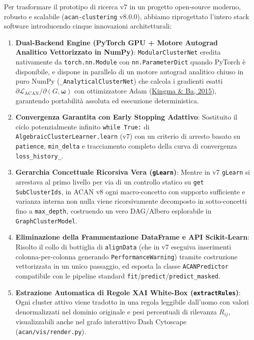 \documentclass[10pt,a4paper]{article}
\begin{document}
Per trasformare il prototipo di ricerca v7 in un progetto open-source moderno, robusto e scalabile (\texttt{acan-clustering} v8.0.0), abbiamo riprogettato l'intero stack software introducendo cinque innovazioni architetturali:
\begin{enumerate}
    \item \textbf{Dual-Backend Engine (PyTorch GPU + Motore Autograd Analitico Vettorizzato in NumPy)}: \texttt{ModularClusterNet} eredita nativamente da \texttt{torch.nn.Module} con \texttt{nn.ParameterDict} quando PyTorch \`e disponibile, e dispone in parallelo di un motore autograd analitico chiuso in puro NumPy (\texttt{\_AnalyticalClusterNet}) che calcola i gradienti esatti $\partial \mathcal{L}_{\text{ACAN}} / \partial (G, \boldsymbol{\omega})$ con ottimizzatore Adam (\href{https://arxiv.org/abs/1412.6980}{Kingma \& Ba, 2015}), garantendo portabilit\`a assoluta ed esecuzione deterministica.
    \item \textbf{Convergenza Garantita con Early Stopping Adattivo}: Sostituito il ciclo potenzialmente infinito \texttt{while True:} di \texttt{AlgebraicClusterLearner.learn} (v7) con un criterio di arresto basato su \texttt{patience}, \texttt{min\_delta} e tracciamento completo della curva di convergenza \texttt{loss\_history\_}.
    \item \textbf{Gerarchia Concettuale Ricorsiva Vera (\texttt{gLearn})}: Mentre in v7 \texttt{gLearn} si arrestava al primo livello per via di un controllo statico su \texttt{get SubClusterIds}, in ACAN v8 ogni macro-concetto con supporto sufficiente e varianza interna non nulla viene ricorsivamente decomposto in sotto-concetti fino a \texttt{max\_depth}, costruendo un vero DAG/Albero esplorabile in \texttt{GraphClusterModel}.
    \item \textbf{Eliminazione della Frammentazione DataFrame e API Scikit-Learn}: Risolto il collo di bottiglia di \texttt{alignData} (che in v7 eseguiva inserimenti colonna-per-colonna generando \texttt{PerformanceWarning}) tramite costruzione vettorizzata in un unico passaggio, ed esposta la classe \texttt{ACANPredictor} compatibile con le pipeline standard \texttt{fit}/\texttt{predict}/\texttt{predict\_masked}.
    \item \textbf{Estrazione Automatica di Regole XAI White-Box (\texttt{extractRules})}: Ogni cluster attivo viene tradotto in una regola leggibile dall'uomo con valori denormalizzati nel dominio originale e pesi percentuali di rilevanza $R_{ij}$, visualizzabili anche nel grafo interattivo Dash Cytoscape (\texttt{acan/vis/render.py}).
\end{enumerate}
\end{document}
